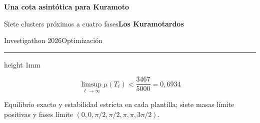 \documentclass[12pt]{article}
\begin{document}
\color{ink}
{\fontsize{58}{65}\selectfont\bfseries Una cota asintótica para Kuramoto\par}
{\fontsize{30}{37}\selectfont Siete clusters próximos a cuatro fases\hfill\textbf{Los Kuramotardos}\par}
{\fontsize{22}{28}\selectfont Investigathon 2026\hfill Optimización\par}
\vspace{2mm}
{\color{teal}\hrule height 1mm}
\vspace{3mm}
{\fontsize{50}{58}\selectfont\color{teal}
\[\boxed{\displaystyle\limsup_{\ell\to\infty}\mu(T_\ell)<\frac{3467}{5000}=0{,}6934}\]}
{\fontsize{24}{31}\selectfont\centering
Equilibrio exacto y estabilidad estricta en cada plantilla; siete masas límite positivas y fases límite $(0,0,\pi/2,\pi/2,\pi,\pi,3\pi/2)$.\par}
\vspace{7mm}
\fontsize{24}{31}\selectfont
\end{document}

